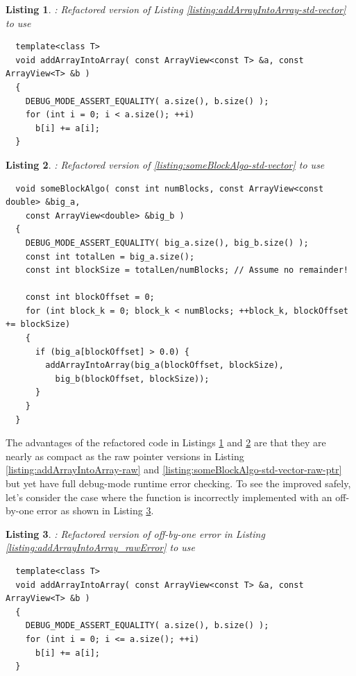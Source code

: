 \documentclass[pdf,ps2pdf,11pt]{SANDreport}
\newtheorem{listing}{Listing}
\begin{document}
{}\begin{listing}: Refactored version of Listing
{}\ref{listing:addArrayIntoArray-std-vector} to use {}
\\
\label{listing:addArrayIntoArray-ArrayView}
{\small\begin{verbatim}
  template<class T>
  void addArrayIntoArray( const ArrayView<const T> &a, const ArrayView<T> &b )
  {
    DEBUG_MODE_ASSERT_EQUALITY( a.size(), b.size() );
    for (int i = 0; i < a.size(); ++i)
      b[i] += a[i];
  }
\end{verbatim}}
\end{listing}

{}\begin{listing}: Refactored version of
{}\ref{listing:someBlockAlgo-std-vector} to use {} \\
\label{listing:someBlockAlgo-ArrayView}
{\small\begin{verbatim}
  void someBlockAlgo( const int numBlocks, const ArrayView<const double> &big_a,
    const ArrayView<double> &big_b )
  {
    DEBUG_MODE_ASSERT_EQUALITY( big_a.size(), big_b.size() );
    const int totalLen = big_a.size();
    const int blockSize = totalLen/numBlocks; // Assume no remainder!
    
    const int blockOffset = 0;
    for (int block_k = 0; block_k < numBlocks; ++block_k, blockOffset += blockSize)
    {
      if (big_a[blockOffset] > 0.0) {
        addArrayIntoArray(big_a(blockOffset, blockSize),
          big_b(blockOffset, blockSize));
      }
    }
  }
\end{verbatim}}
\end{listing}

The advantages of the refactored code in Listings
{}\ref{listing:addArrayIntoArray-ArrayView} and
{}\ref{listing:someBlockAlgo-ArrayView} are that they are nearly as
compact as the raw pointer versions in Listing
{}\ref{listing:addArrayIntoArray-raw} and
{}\ref{listing:someBlockAlgo-std-vector-raw-ptr} but yet have full
debug-mode runtime error checking.  To see the improved safely, let's
consider the case where the {}  function
is incorrectly implemented with an off-by-one error as shown in
Listing {}\ref{listing:addArrayIntoArray-ArrayViewError}.

\begin{listing}: Refactored version of off-by-one error in Listing
  {}\ref{listing:addArrayIntoArray_rawError} to use {} \\
\label{listing:addArrayIntoArray-ArrayViewError}
{\small\begin{verbatim}
  template<class T>
  void addArrayIntoArray( const ArrayView<const T> &a, const ArrayView<T> &b )
  {
    DEBUG_MODE_ASSERT_EQUALITY( a.size(), b.size() );
    for (int i = 0; i <= a.size(); ++i)
      b[i] += a[i];
  }
\end{verbatim}}
\end{listing}
\end{document}
